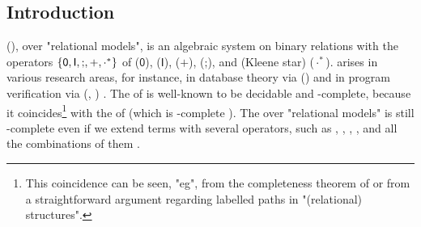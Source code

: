\documentclass[a4paper,UKenglish,cleveref, autoref, thm-restate]{lipics-v2021}
\DeclarePairedDelimiter\set{\{}{\}}
\newcommand{\const}[1]{\mathsf{#1}}
\newcommand{\bl}{\cdot}
\newcommand{\union}{\mathbin{+}}
\newcommand{\id}{\const{I}}
\newcommand{\emp}{\const{0}}
\newcommand{\compo}{\mathbin{;}}
\begin{document}
%
\begin{scope}

\section{Introduction} \label{section: introduction}
\AP
\intro*{} (\reintro*{}), \intro*{} over "relational models",
is an algebraic system on binary relations with the operators $\set{\emp, \id, \compo, \union, \bl^{*}}$ of
 ($\emp$),
 ($\id$),
 ($\union$),
 ($\compo$),
and  (Kleene star) ($\bl^{*}$).
 arises in various research areas,
for instance,
in database theory via \intro*{} () \cite{calvaneseRewritingRegularExpressions1999} and
in program verification via \intro*{} (\reintro*{}, \reintro*{}) \cite{kozenKleeneAlgebraTests1996}.
The  of  is well-known to be decidable and -complete,
because it coincides\footnote{\label{footnote: lang and REL equiv}%
This coincidence can be seen, "eg", from the completeness theorem of  \cite{kozenCompletenessTheoremKleene1994} or from a straightforward argument regarding labelled paths in "(relational) structures".} with the  of  (which is -complete \cite{meyerEquivalenceProblemRegular1972}).
The  over "relational models" is still -complete even if
we extend  terms with several operators,
such as
 \cite{kozenKleeneAlgebraTests1996},
 \cite{brunetKleeneAlgebraConverse2014},
 \cite{nakamuraExistentialCalculiRelations2023,pousCompletenessTheoremsKleene2024},
 \cite{nakamuraDerivativesGraphsPositive2025},
and all the combinations of them \cite[Cor.~6.7]{nakamuraDerivativesGraphsPositive2025}.


\end{scope}
\end{document}
